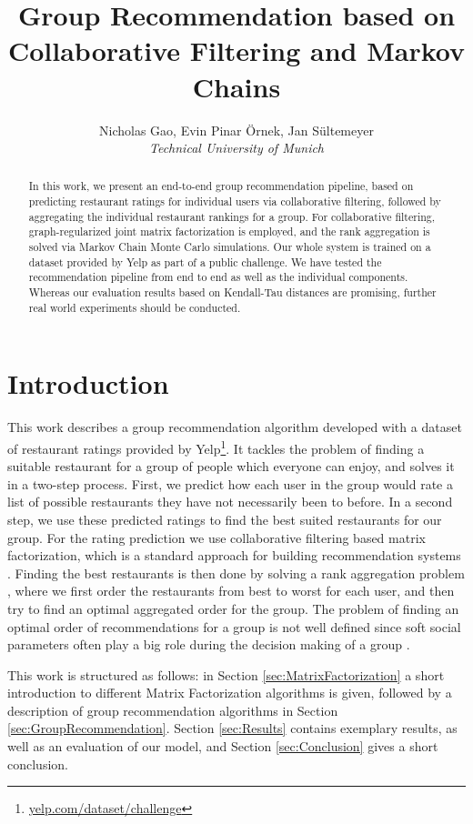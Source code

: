\documentclass[a4paper]{article}
\title{Group Recommendation based on Collaborative Filtering and Markov Chains}
\author{ {\rm Nicholas Gao, Evin Pinar Örnek, Jan Sültemeyer} \\ \textit{Technical University of Munich}}
\date{}
\begin{document}
\maketitle

\begin{abstract}
In this work, we present an end-to-end group recommendation pipeline, based on predicting restaurant ratings for individual users via collaborative filtering, followed by aggregating the individual restaurant rankings for a group.
For collaborative filtering, graph-regularized joint matrix factorization is employed, and the rank aggregation is solved via Markov Chain Monte Carlo simulations. Our whole system is trained on a dataset provided by Yelp as part of a public challenge. We have tested the recommendation pipeline from end to end as well as the individual components. Whereas our evaluation results based on Kendall-Tau distances are promising, further real world experiments should be conducted.
\end{abstract}

\section{Introduction}
This work describes a group recommendation algorithm developed with a dataset of restaurant ratings provided by Yelp\footnote{\href{https://www.yelp.com/dataset/challenge}{yelp.com/dataset/challenge}}.
It tackles the problem of finding a suitable restaurant for a group of people which everyone can enjoy, and solves it in a two-step process. First, we predict how each user in the group would rate a list of possible restaurants they have not necessarily been to before. In a second step, we use these predicted ratings to find the best suited restaurants for our group. For the rating prediction we use collaborative filtering based matrix factorization, which is a standard approach for building recommendation systems \cite{Dheeraj15}. Finding the best restaurants is then done by solving a rank aggregation problem \cite{Dwork03}, where we first order the restaurants from best to worst for each user, and then try to find an optimal aggregated order for the group. The problem of finding an optimal order of recommendations for a group is not well defined since soft social parameters often play a big role during the decision making of a group \cite{mccarthy2006group,katarya2017systematic,jameson2004more}.

This work is structured as follows: in Section \ref{sec:MatrixFactorization} a short introduction to different Matrix Factorization algorithms is given, followed by a description of group recommendation algorithms in Section \ref{sec:GroupRecommendation}. Section \ref{sec:Results} contains exemplary results, as well as an evaluation of our model, and Section \ref{sec:Conclusion} gives a short conclusion.
\end{document}
